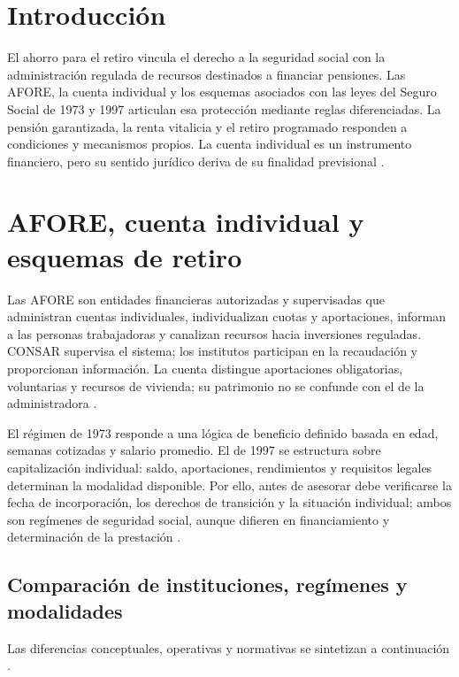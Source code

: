 \documentclass[11pt,letterpaper,oneside]{article}
\begin{document}
\tableofcontents
\clearpage

\section{Introducción}
El ahorro para el retiro vincula el derecho a la seguridad social con la administración regulada de recursos destinados a financiar pensiones. Las AFORE, la cuenta individual y los esquemas asociados con las leyes del Seguro Social de 1973 y 1997 articulan esa protección mediante reglas diferenciadas. La pensión garantizada, la renta vitalicia y el retiro programado responden a condiciones y mecanismos propios. La cuenta individual es un instrumento financiero, pero su sentido jurídico deriva de su finalidad previsional \citep{cpeum2026,lss2026,bricenoRuiz2011}.

\section{AFORE, cuenta individual y esquemas de retiro}
Las AFORE son entidades financieras autorizadas y supervisadas que administran cuentas individuales, individualizan cuotas y aportaciones, informan a las personas trabajadoras y canalizan recursos hacia inversiones reguladas. CONSAR supervisa el sistema; los institutos participan en la recaudación y proporcionan información. La cuenta distingue aportaciones obligatorias, voluntarias y recursos de vivienda; su patrimonio no se confunde con el de la administradora \citep{bricenoRuiz2011,consarSitio2026,lss2026}.

El régimen de 1973 responde a una lógica de beneficio definido basada en edad, semanas cotizadas y salario promedio. El de 1997 se estructura sobre capitalización individual: saldo, aportaciones, rendimientos y requisitos legales determinan la modalidad disponible. Por ello, antes de asesorar debe verificarse la fecha de incorporación, los derechos de transición y la situación individual; ambos son regímenes de seguridad social, aunque difieren en financiamiento y determinación de la prestación \citep{lss2026,bricenoRuiz2011}.

\subsection{Comparación de instituciones, regímenes y modalidades}
Las diferencias conceptuales, operativas y normativas se sintetizan a continuación \citep{lss2026,consarSitio2026,bricenoRuiz2011}.
\end{document}

